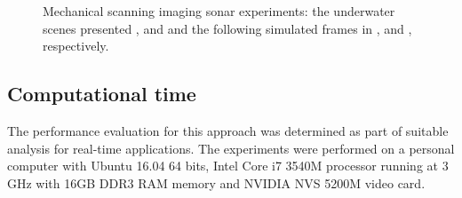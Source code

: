 \documentclass[final,5p,times]{elsarticle}
\begin{document}
\begin{figure}[!ht]
{        \label{fig:msis_sim2}
    }
    \captionsetup{justification=centering}
    \caption{Mechanical scanning imaging sonar experiments: the underwater scenes presented ,  and  and the following simulated frames in ,  and , respectively.}
    \label{fig:msis}
\end{figure}

\subsection{Computational time}

The performance evaluation for this approach was determined as part of suitable analysis for real-time applications. The experiments were performed on a personal computer with Ubuntu 16.04 64 bits, Intel Core i7 3540M processor running at 3 GHz with 16GB DDR3 RAM memory and NVIDIA NVS 5200M video card.
\end{document}
